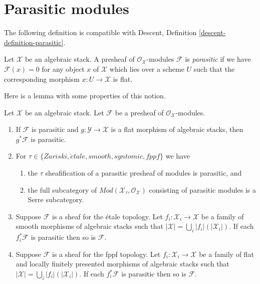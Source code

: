 \section{Parasitic modules}
\label{section-parasitic}

\noindent
The following definition is compatible with
Descent, Definition \ref{descent-definition-parasitic}.

\begin{definition}
\label{definition-parasitic}
Let $\mathcal{X}$ be an algebraic stack.
A presheaf of $\mathcal{O}_\mathcal{X}$-modules $\mathcal{F}$ is
{\it parasitic} if we have $\mathcal{F}(x) = 0$ for any object $x$
of $\mathcal{X}$ which lies over a scheme $U$ such that the corresponding
morphism $x : U \to \mathcal{X}$ is flat.
\end{definition}

\noindent
Here is a lemma with some properties of this notion.

\begin{lemma}
\label{lemma-parasitic}
Let $\mathcal{X}$ be an algebraic stack. Let $\mathcal{F}$
be a presheaf of $\mathcal{O}_\mathcal{X}$-modules.
\begin{enumerate}
\item If $\mathcal{F}$ is parasitic and
$g : \mathcal{Y} \to \mathcal{X}$ is a flat morphism of algebraic stacks,
then $g^*\mathcal{F}$ is parasitic.
\item For $\tau \in \{Zariski, \acute{e}tale, smooth, syntomic, fppf\}$
we have
\begin{enumerate}
\item the $\tau$ sheafification of a parasitic presheaf of modules is
parasitic, and
\item the full subcategory of
$\textit{Mod}(\mathcal{X}_\tau, \mathcal{O}_\mathcal{X})$
consisting of parasitic modules is a Serre subcategory.
\end{enumerate}
\item Suppose $\mathcal{F}$ is a sheaf for the \'etale topology.
Let $f_i : \mathcal{X}_i \to \mathcal{X}$ be a family of
smooth morphisms of algebraic stacks such that
$|\mathcal{X}| = \bigcup_i |f_i|(|\mathcal{X}_i|)$. If each
$f_i^*\mathcal{F}$ is parasitic then so is $\mathcal{F}$.
\item Suppose $\mathcal{F}$ is a sheaf for the fppf topology.
Let $f_i : \mathcal{X}_i \to \mathcal{X}$ be a family of
flat and locally finitely presented morphisms of algebraic stacks such that
$|\mathcal{X}| = \bigcup_i |f_i|(|\mathcal{X}_i|)$. If each
$f_i^*\mathcal{F}$ is parasitic then so is $\mathcal{F}$.
\end{enumerate}
\end{lemma}

